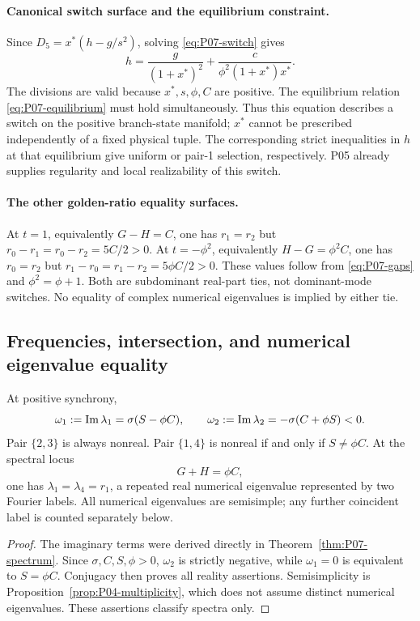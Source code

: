 \paragraph{Canonical switch surface and the equilibrium constraint.}
Since $D_5=x^*(h-g/s^2)$, solving \eqref{eq:P07-switch} gives
\begin{equation}
 \boxed{h=\frac{g}{(1+x^*)^2}
            +\frac{c}{\phi^2(1+x^*)x^*}.}
 \label{eq:P07-canonical-switch}
\end{equation}
The divisions are valid because $x^*,s,\phi,C$ are positive.
The equilibrium relation \eqref{eq:P07-equilibrium} must hold
simultaneously. Thus this equation describes a switch on the positive
branch-state manifold; $x^*$ cannot be prescribed independently of
a fixed physical tuple. The corresponding strict inequalities in $h$
at that equilibrium give uniform or pair-1 selection, respectively.
P05 already supplies regularity and local realizability of this switch.

\paragraph{The other golden-ratio equality surfaces.}
At $t=1$, equivalently $G-H=C$, one has $r_1=r_2$ but
$r_0-r_1=r_0-r_2=5C/2>0$. At $t=-\phi^2$, equivalently
$H-G=\phi^2C$, one has $r_0=r_2$ but
$r_1-r_0=r_1-r_2=5\phi C/2>0$.
These values follow from \eqref{eq:P07-gaps} and $\phi^2=\phi+1$.
Both are subdominant real-part ties, not dominant-mode switches.
No equality of complex numerical eigenvalues is implied by either tie.

\subsection{Frequencies, intersection, and numerical eigenvalue equality}
\begin{proposition}
\label{prop:P07-frequency}
At positive synchrony,
\begin{equation}
 \omega_1:=\operatorname{Im}\lambda_1=\sigma(S-\phi C),\qquad
 \omega_2:=\operatorname{Im}\lambda_2=-\sigma(C+\phi S)<0.
 \label{eq:P07-frequency}
\end{equation}
Pair $\{2,3\}$ is always nonreal. Pair $\{1,4\}$ is nonreal
if and only if $S\ne\phi C$. At the spectral locus
\begin{equation}
 \boxed{G+H=\phi C,}\label{eq:P07-frequency-locus}
\end{equation}
one has $\lambda_1=\lambda_4=r_1$, a repeated real numerical
 eigenvalue represented by two Fourier labels. All numerical eigenvalues
are semisimple; any further coincident label is counted separately below.
\end{proposition}
\begin{proof}
The imaginary terms were derived directly in Theorem~\ref{thm:P07-spectrum}.
Since $\sigma,C,S,\phi>0$, $\omega_2$ is strictly negative, while
$\omega_1=0$ is equivalent to $S=\phi C$. Conjugacy then proves
all reality assertions. Semisimplicity is
Proposition~\ref{prop:P04-multiplicity}, which does not assume distinct
 numerical eigenvalues. These assertions classify spectra only.
\end{proof}

